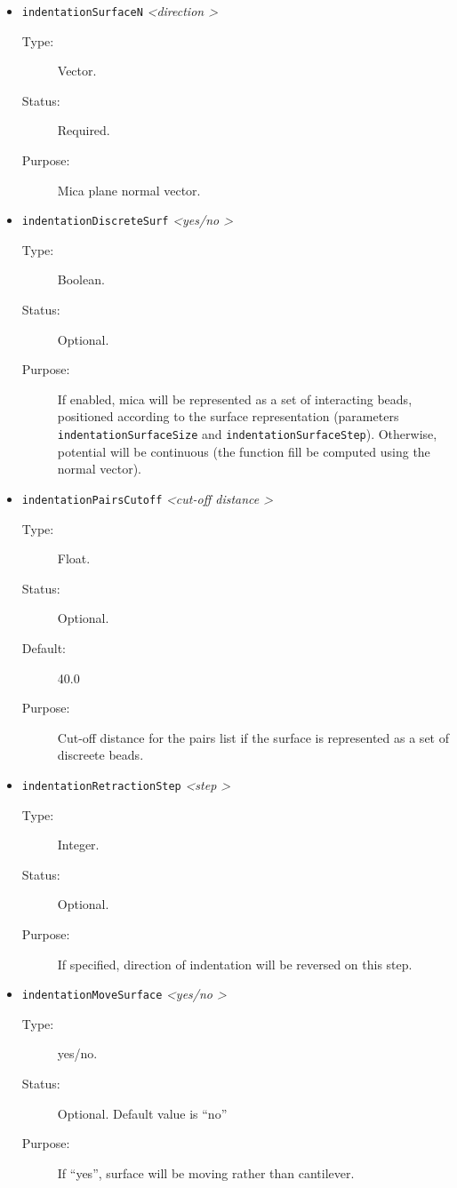 \documentclass[a4paper]{article}
\begin{document}
\begin{itemize}
\item \texttt{indentationSurfaceN} \textit{\textless direction \textgreater}
\begin{description}
\item[Type:] Vector.
\item[Status:] Required.
\item[Purpose:] Mica plane normal vector.
\end{description}

\item \texttt{indentationDiscreteSurf} \textit{\textless yes/no \textgreater}
\begin{description}
\item[Type:] Boolean.
\item[Status:] Optional.
\item[Purpose:] If enabled, mica will be represented as a set of interacting beads, positioned according to the surface representation (parameters \texttt{indentationSurfaceSize} and \texttt{indentationSurfaceStep}). Otherwise, potential will be continuous (the function fill be computed using the normal vector).
\end{description}

\item \texttt{indentationPairsCutoff} \textit{\textless cut-off distance \textgreater}
\begin{description}
\item[Type:] Float.
\item[Status:] Optional.
\item[Default:] 40.0
\item[Purpose:] Cut-off distance for the pairs list if the surface is represented as a set of discreete beads.
\end{description}

\item \texttt{indentationRetractionStep} \textit{\textless step \textgreater}
\begin{description}
\item[Type:] Integer.
\item[Status:] Optional.
\item[Purpose:] If specified, direction of indentation will be reversed on this step.
\end{description}

\item \texttt{indentationMoveSurface} \textit{\textless yes/no \textgreater}
\begin{description}
\item[Type:] yes/no.
\item[Status:] Optional. Default value is ``no''
\item[Purpose:] If ``yes'', surface will be moving rather than cantilever.
\end{description}


\end{itemize}
\end{document}
